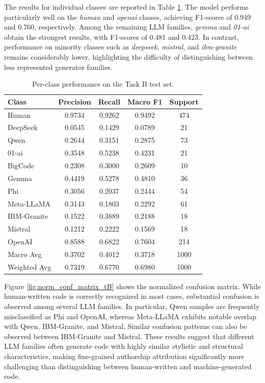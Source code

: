 \documentclass[11pt]{article}
\begin{document}
The results for individual classes are reported in Table \ref{tab:class_results}. The model performs particularly well on the \textit{human} and \textit{openai} classes, achieving F1-scores of 0.949 and 0.760, respectively. Among the remaining LLM families, \textit{gemma} and \textit{01-ai} obtain the strongest results, with F1-scores of 0.481 and 0.423. In contrast, performance on minority classes such as \textit{deepseek}, \textit{mistral}, and \textit{ibm-granite} remains considerably lower, highlighting the difficulty of distinguishing between less represented generator families.
\begin{table}[h]
  \centering
  \small
  \setlength{\tabcolsep}{4pt}
  \caption{Per-class performance on the Task B test set.}
  \label{tab:class_results}
  \begin{tabular}{lcccc}
    \toprule
    \textbf{Class} & \textbf{Precision} & \textbf{Recall} & \textbf{Macro F1} & \textbf{Support} \\
    \midrule
    Human & 0.9734 & 0.9262 & 0.9492 & 474 \\
    DeepSeek & 0.0545 & 0.1429 & 0.0789 & 21 \\
    Qwen & 0.2644 & 0.3151 & 0.2875 & 73 \\
    01-ai & 0.3548 & 0.5238 & 0.4231 & 21 \\
    BigCode & 0.2308 & 0.3000 & 0.2609 & 10 \\
    Gemma & 0.4419 & 0.5278 & 0.4810 & 36 \\
    Phi & 0.3056 & 0.2037 & 0.2444 & 54 \\
    Meta-LLaMA & 0.3143 & 0.1803 & 0.2292 & 61 \\
    IBM-Granite & 0.1522 & 0.3889 & 0.2188 & 18 \\
    Mistral & 0.1212 & 0.2222 & 0.1569 & 18 \\
    OpenAI & 0.8588 & 0.6822 & 0.7604 & 214 \\
    \midrule
    Macro Avg & 0.3702 & 0.4012 & 0.3718 & 1000 \\
    Weighted Avg & 0.7319 & 0.6770 & 0.6980 & 1000 \\
    \bottomrule
  \end{tabular}
\end{table}

Figure \ref{fig:norm_conf_matrix_tB} shows the normalized confusion matrix. While human-written code is correctly recognized in most cases, substantial confusion is observed among several LLM families. In particular, Qwen samples are frequently misclassified as Phi and OpenAI, whereas Meta-LLaMA exhibits notable overlap with Qwen, IBM-Granite, and Mistral. Similar confusion patterns can also be observed between IBM-Granite and Mistral. These results suggest that different LLM families often generate code with highly similar stylistic and structural characteristics, making fine-grained authorship attribution significantly more challenging than distinguishing between human-written and machine-generated code.
\end{document}
